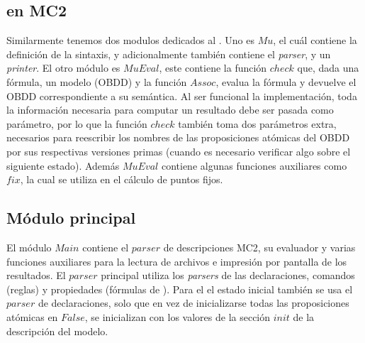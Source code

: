 \subsection{{\mucalculo} en MC2}

Similarmente tenemos dos modulos dedicados al {\mucalculo}. Uno es $Mu$, el cuál contiene la definición de la sintaxis, y adicionalmente también contiene el \textit{parser}, y un \textit{printer}. El otro módulo es $MuEval$, este contiene la función $check$ que, dada una fórmula, un modelo (OBDD) y la función $Assoc$, evalua la fórmula y devuelve el OBDD correspondiente a su semántica. Al ser funcional la implementación, toda la información necesaria para computar un resultado debe ser pasada como parámetro, por lo que la función $check$ también toma dos parámetros extra, necesarios para reescribir los nombres de las proposiciones atómicas del OBDD por sus respectivas versiones primas (cuando es necesario verificar algo sobre el siguiente estado). Además $MuEval$ contiene algunas funciones auxiliares como $fix$, la cual se utiliza en el cálculo de puntos fijos.

\subsection{Módulo principal}

El módulo $Main$ contiene el $parser$ de descripciones MC2, su evaluador y varias funciones auxiliares para la lectura de archivos e impresión por pantalla de los resultados. El $parser$ principal utiliza los \textit{parsers} de las declaraciones, comandos (reglas) y propiedades (fórmulas de {\mucalculo}). Para el el estado inicial también se usa el $parser$ de declaraciones, solo que en vez de inicializarse todas las proposiciones atómicas en $False$, se inicializan con los valores de la sección $init$ de la descripción del modelo.